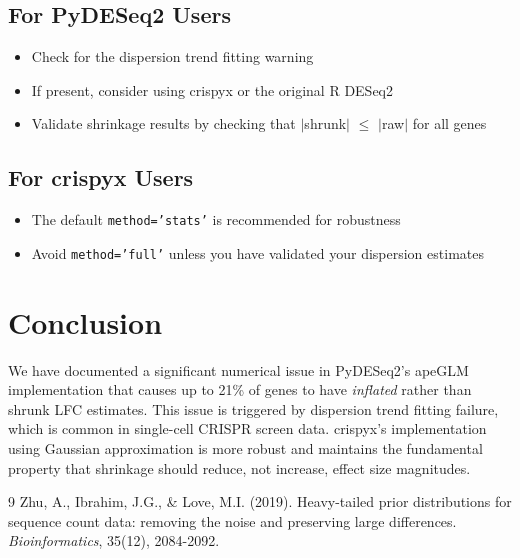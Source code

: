 \documentclass{article}
\begin{document}
\subsection{For PyDESeq2 Users}
\begin{itemize}
    \item Check for the dispersion trend fitting warning
    \item If present, consider using crispyx or the original R DESeq2
    \item Validate shrinkage results by checking that $|$shrunk$|$ $\leq$ $|$raw$|$ for all genes
\end{itemize}

\subsection{For crispyx Users}
\begin{itemize}
    \item The default \texttt{method='stats'} is recommended for robustness
    \item Avoid \texttt{method='full'} unless you have validated your dispersion estimates
\end{itemize}

\section{Conclusion}

We have documented a significant numerical issue in PyDESeq2's apeGLM implementation that causes up to 21\% of genes to have \emph{inflated} rather than shrunk LFC estimates. This issue is triggered by dispersion trend fitting failure, which is common in single-cell CRISPR screen data. crispyx's implementation using Gaussian approximation is more robust and maintains the fundamental property that shrinkage should reduce, not increase, effect size magnitudes.

\begin{thebibliography}{9}
Zhu, A., Ibrahim, J.G., \& Love, M.I. (2019).
Heavy-tailed prior distributions for sequence count data: removing the noise and preserving large differences.
\textit{Bioinformatics}, 35(12), 2084-2092.
\end{thebibliography}
\end{document}
